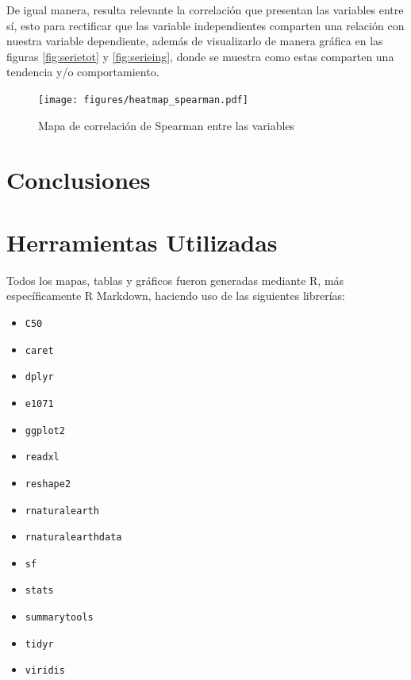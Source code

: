 \documentclass[conference]{IEEEtran}
\begin{document}
De igual manera, resulta relevante la correlación que presentan las variables entre sí, esto para rectificar que las variable independientes comparten una relación con nuestra variable dependiente, además de visualizarlo de manera gráfica en las figuras \ref{fig:serietot} y  \ref{fig:serieing}, donde se muestra como estas comparten una tendencia y/o comportamiento.

\begin{figure}[h]
    \centering
    \texttt{[image: figures/heatmap\_spearman.pdf]}
    \caption{Mapa de correlación de Spearman entre las variables}
    \label{fig:heatmap}
\end{figure}

\section{Conclusiones}


\section{Herramientas Utilizadas}

Todos los mapas, tablas y gráficos fueron generadas mediante R, más específicamente R Markdown, haciendo uso de las siguientes librerías:

\begin{multicols}{2}
    \begin{itemize} \footnotesize
      \item \texttt{C50}
      \item \texttt{caret}
      \item \texttt{dplyr}
      \item \texttt{e1071}
      \item \texttt{ggplot2}
      \item \texttt{readxl}
      \item \texttt{reshape2}
      \item \texttt{rnaturalearth}
      \item \texttt{rnaturalearthdata}
      \item \texttt{sf}
      \item \texttt{stats}
      \item \texttt{summarytools}
      \item \texttt{tidyr}
      \item \texttt{viridis}
    \end{itemize}
\end{multicols}
\end{document}
